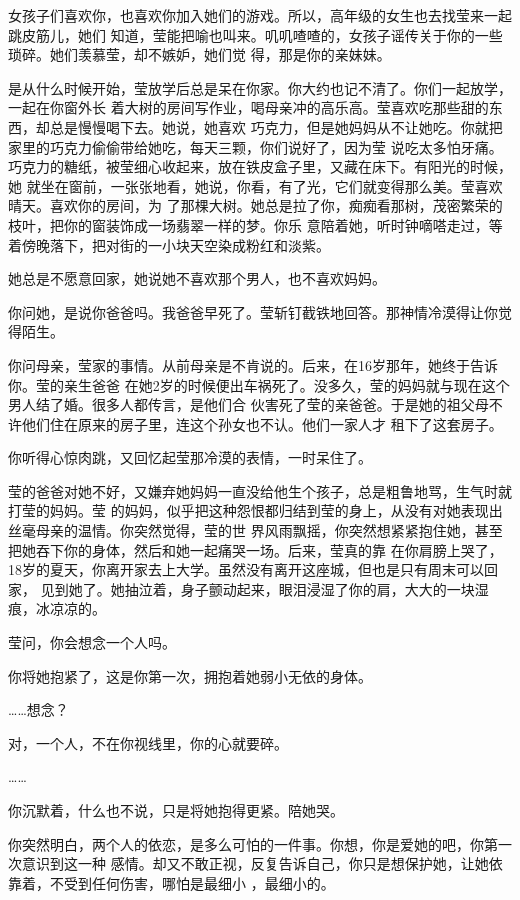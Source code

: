 \documentclass[12pt,a4paper]{article}
\begin{document}
		女孩子们喜欢你，也喜欢你加入她们的游戏。所以，高年级的女生也去找莹来一起跳皮筋儿，她们
	知道，莹能把喻也叫来。叽叽喳喳的，女孩子谣传关于你的一些琐碎。她们羡慕莹，却不嫉妒，她们觉
	得，那是你的亲妹妹。


		是从什么时候开始，莹放学后总是呆在你家。你大约也记不清了。你们一起放学，一起在你窗外长
	着大树的房间写作业，喝母亲冲的高乐高。莹喜欢吃那些甜的东西，却总是慢慢喝下去。她说，她喜欢
	巧克力，但是她妈妈从不让她吃。你就把家里的巧克力偷偷带给她吃，每天三颗，你们说好了，因为莹
	说吃太多怕牙痛。巧克力的糖纸，被莹细心收起来，放在铁皮盒子里，又藏在床下。有阳光的时候，她
	就坐在窗前，一张张地看，她说，你看，有了光，它们就变得那么美。莹喜欢晴天。喜欢你的房间，为
	了那棵大树。她总是拉了你，痴痴看那树，茂密繁荣的枝叶，把你的窗装饰成一场翡翠一样的梦。你乐
	意陪着她，听时钟嘀嗒走过，等着傍晚落下，把对街的一小块天空染成粉红和淡紫。

		她总是不愿意回家，她说她不喜欢那个男人，也不喜欢妈妈。

		你问她，是说你爸爸吗。我爸爸早死了。莹斩钉截铁地回答。那神情冷漠得让你觉得陌生。


		你问母亲，莹家的事情。从前母亲是不肯说的。后来，在16岁那年，她终于告诉你。莹的亲生爸爸
	在她2岁的时候便出车祸死了。没多久，莹的妈妈就与现在这个男人结了婚。很多人都传言，是他们合
	伙害死了莹的亲爸爸。于是她的祖父母不许他们住在原来的房子里，连这个孙女也不认。他们一家人才
	租下了这套房子。

		你听得心惊肉跳，又回忆起莹那冷漠的表情，一时呆住了。

		莹的爸爸对她不好，又嫌弃她妈妈一直没给他生个孩子，总是粗鲁地骂，生气时就打莹的妈妈。莹
	的妈妈，似乎把这种怨恨都归结到莹的身上，从没有对她表现出丝毫母亲的温情。你突然觉得，莹的世
	界风雨飘摇，你突然想紧紧抱住她，甚至把她吞下你的身体，然后和她一起痛哭一场。后来，莹真的靠
	在你肩膀上哭了，18岁的夏天，你离开家去上大学。虽然没有离开这座城，但也是只有周末可以回家，
	见到她了。她抽泣着，身子颤动起来，眼泪浸湿了你的肩，大大的一块湿痕，冰凉凉的。

		莹问，你会想念一个人吗。

		你将她抱紧了，这是你第一次，拥抱着她弱小无依的身体。

		……想念？

		对，一个人，不在你视线里，你的心就要碎。

		……

		你沉默着，什么也不说，只是将她抱得更紧。陪她哭。

		你突然明白，两个人的依恋，是多么可怕的一件事。你想，你是爱她的吧，你第一次意识到这一种
	感情。却又不敢正视，反复告诉自己，你只是想保护她，让她依靠着，不受到任何伤害，哪怕是最细小
	，最细小的。
\end{document}
